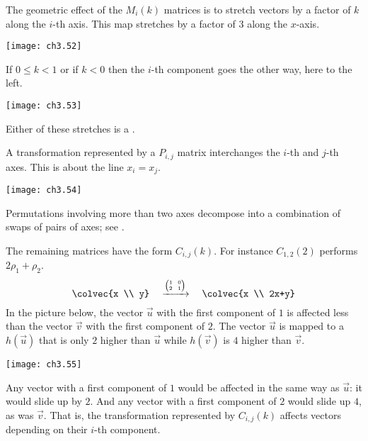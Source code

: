 The geometric effect of the $M_i(k)$ matrices
is to  
stretch vectors by a factor of $k$ along the $i$-th axis.
This map stretches by a factor of $3$ along the $x$-axis.
\begin{center}
  \texttt{[image: ch3.52]}
\end{center}
If $0\leq k<1$ or if $k<0$ then the $i$-th
component goes the other way, here to the left.
\begin{center}
  \texttt{[image: ch3.53]}
\end{center}
Either of these stretches is a 
.

A transformation represented by a $P_{i,j}$ matrix
interchanges the $i$-th and $j$-th axes.
This is  
about the line $x_i=x_j$.
\begin{center}
  \texttt{[image: ch3.54]}
\end{center}
Permutations involving more than two axes decompose into a combination 
of swaps of pairs of axes; see .

The remaining  matrices have the form $C_{i,j}(k)$.
For instance $C_{1,2}(2)$ performs $2\rho_1+\rho_2$. 
\begin{equation*}
  \colvec{x  \\  y}\quad
  \xrightarrow{\text{\tiny$\displaystyle\left(\begin{array}[r]{@{}c@{\hspace{0.8em}}c@{}}
                1  &0  \\
                2  &1  
          \end{array}\right)$}}  %
   \quad\colvec{x \\ 2x+y}
\end{equation*}
In the picture below, 
the vector $\vec{u}$ with the first component of $1$ is affected less 
than the vector $\vec{v}$ with the first component of $2$.
The vector $\vec{u}$ is mapped to a
$h(\vec{u})$ that is only $2$ higher than $\vec{u}$ while 
$h(\vec{v})$ is $4$ higher than $\vec{v}$.
\begin{center}
  \texttt{[image: ch3.55]}
\end{center}
Any vector with a first component of $1$ would be affected 
in the same way as $\vec{u}$:
it would slide up by $2$.
And any vector with a first component of $2$ would slide up $4$, 
as was $\vec{v}$.
That is, the transformation represented by 
$C_{i,j}(k)$ affects vectors depending on their $i$-th component.

